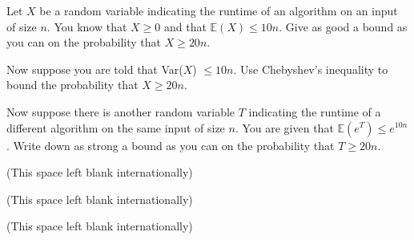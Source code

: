 \documentclass[12pt,twoside]{article}
\begin{document}
\newpage
\begin{problem}{15} Let $X$ be a random variable indicating the runtime of an algorithm on an input of size $n$. You know that $X \geq 0$ and that $\mathbb{E}(X) \leq 10n$.  
\bparts
{} Give as good a bound as you can on the probability that $X \geq 20n$. 
\vspace{3.5in} 

\newpage
{} Now suppose you are told that Var($X$)  $ \leq 10n$.  Use Chebyshev's inequality to bound the probability that $X \geq 20n$. 
\vspace{3.5in} 

\newpage
{} Now suppose there is another random variable $T$ indicating the runtime of a different algorithm on the same input of size $n$.  You are given that $\mathbb{E}(e^T) \leq e^{10n}$.  Write down as strong a bound as you can on the probability that $T \geq 20n$.  
\eparts
\end{problem}


\newpage 
\begin{center}
(This space left blank internationally)
\end{center}

\newpage
\begin{center}
(This space left blank internationally)
\end{center}

\mbox{}

\newpage
\begin{center}
(This space left blank internationally)
\end{center}

\mbox{}
\end{document}
